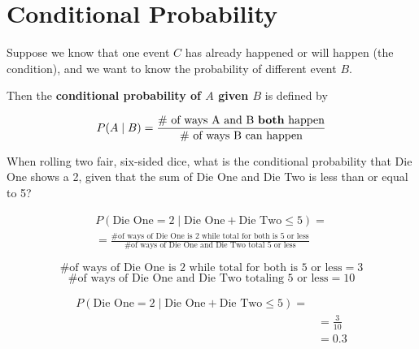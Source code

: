 \section{Conditional Probability}

%
\begin{frame}

Suppose we know that one event $C$ has already happened or will happen (the
condition), and we want to know the probability of different event $B$.

\hfill

Then the \textbf{conditional probability of $A$ given $B$} is defined by

$$ P(A \mid B) = \frac{\text{\# of ways A and B \textbf{both} happen}}{\text{\#
of ways B can happen}} $$

\end{frame}
%

%
\begin{frame}
When rolling two fair, six-sided dice, what is the conditional probability that Die One shows a 2, given that the sum of Die One and Die Two is less than or equal to 5?

\begin{align*}
P(\text{Die One} = 2   \mid \text{Die One} + \text{Die Two} \leq 5) = \\
= \frac{\text{\# of ways of Die One is 2 while total for both is 5 or less}}{\text{\# of ways of Die One and Die Two total 5 or less}}
\end{align*}

\end{frame}
%

%
\begin{frame}

$$\text{\#of ways of Die One is 2 while total for both is 5 or less} = 3 $$
$$ \text{\# of ways of Die One and Die Two totaling 5 or less} = 10 $$

\end{frame}
%

%
\begin{frame}

\begin{align*}
P(\text{Die One} = 2 \mid \text{Die One} + \text{Die Two} \leq 5) = \\
&= \frac{3}{10} \\
&= 0.3
\end{align*}

\end{frame}
%

